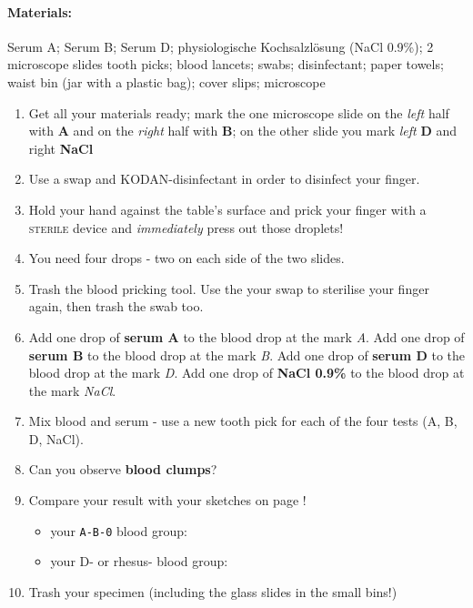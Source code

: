 \paragraph{Materials:} Serum A; Serum B; Serum D; physiologische Kochsalzlösung (NaCl 0.9\%); 2 microscope slides tooth picks; blood lancets; swabs; disinfectant; paper towels; waist bin (jar with a plastic bag); cover slips; microscope
		\begin{enumerate}[label=\textit{(\arabic*)},leftmargin=1em,series=zaehler,itemsep=-2pt]
		      \item Get all your materials ready; mark the one microscope slide on the \textit{left} half with \textbf{A} and on the \textit{right} half with \textbf{B}; on the other slide you mark \textit{left} \textbf{D} and right \textbf{NaCl}

		      \item Use a swap and KODAN-disinfectant  in order to disinfect your finger.

		       \item Hold your hand against the table's surface and prick your finger with a \textsc{sterile} device and  \emph{immediately} press out those droplets!

		      \item You need four drops - two on each side of the two slides.

	              \item Trash the blood pricking tool. Use the your swap to sterilise your finger again, then trash the swab too.

		      \item Add one drop of \textbf{serum A }to the blood drop at the mark \emph{A}.
		      Add one drop of \textbf{serum B }to the blood drop at the mark \emph{B}.
		      Add one drop of \textbf{serum D }to the blood drop at the mark \emph{D}.
		      Add one drop of \textbf{NaCl 0.9\% }to the blood drop at the mark \emph{NaCl}.

		     \item Mix blood and serum - use a new tooth pick for each of the four tests (A, B, D, NaCl).

		     \item Can you observe \textbf{blood clumps}?  
		      \item Compare your result with your sketches on page \pageref{exc:BloodTypeTheory}!
			      \begin{itemize}
			       \item your \texttt{A-B-0} blood group: 
			       \item your D- or rhesus- blood group: 
			      \end{itemize}
		      \item Trash your specimen (including the glass slides in the small bins!)
		\end{enumerate}
		
